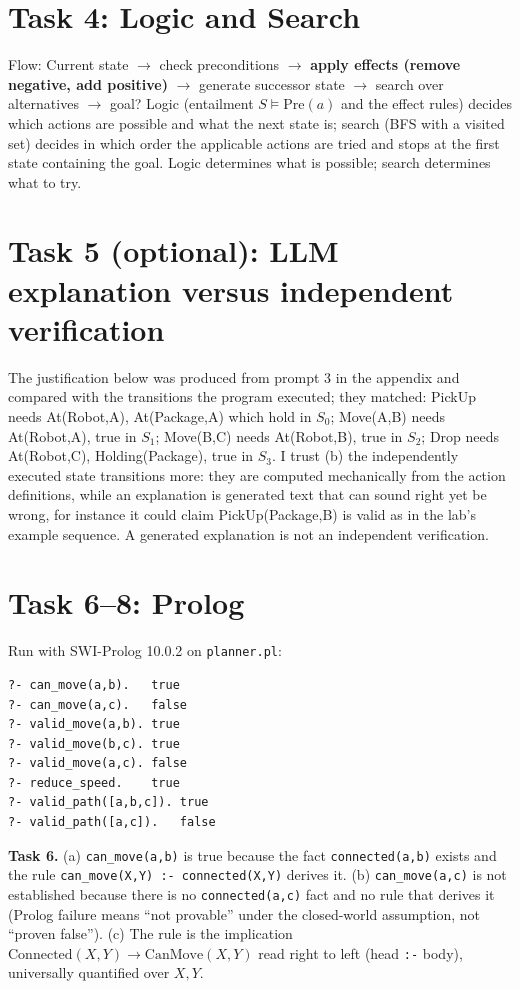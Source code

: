 \documentclass[10pt,a4paper]{article}
\begin{document}
\section*{Task 4: Logic and Search}
Flow: Current state $\to$ check preconditions $\to$ \textbf{apply effects (remove negative, add positive)} $\to$ generate successor state $\to$ search over alternatives $\to$ goal? Logic (entailment $S\models \mathrm{Pre}(a)$ and the effect rules) decides which actions are possible and what the next state is; search (BFS with a visited set) decides in which order the applicable actions are tried and stops at the first state containing the goal. Logic determines what is possible; search determines what to try.

\section*{Task 5 (optional): LLM explanation versus independent verification}
The justification below was produced from prompt 3 in the appendix and compared with the transitions the program executed; they matched: PickUp needs At(Robot,A), At(Package,A) which hold in $S_0$; Move(A,B) needs At(Robot,A), true in $S_1$; Move(B,C) needs At(Robot,B), true in $S_2$; Drop needs At(Robot,C), Holding(Package), true in $S_3$. I trust (b) the independently executed state transitions more: they are computed mechanically from the action definitions, while an explanation is generated text that can sound right yet be wrong, for instance it could claim PickUp(Package,B) is valid as in the lab's example sequence. A generated explanation is not an independent verification.

\section*{Task 6--8: Prolog}
Run with SWI-Prolog 10.0.2 on \texttt{planner.pl}:
\begin{Verbatim}
?- can_move(a,b).   true
?- can_move(a,c).   false
?- valid_move(a,b). true
?- valid_move(b,c). true
?- valid_move(a,c). false
?- reduce_speed.    true
?- valid_path([a,b,c]). true
?- valid_path([a,c]).   false
\end{Verbatim}
\textbf{Task 6.} (a) \texttt{can\_move(a,b)} is true because the fact \texttt{connected(a,b)} exists and the rule \texttt{can\_move(X,Y) :- connected(X,Y)} derives it. (b) \texttt{can\_move(a,c)} is not established because there is no \texttt{connected(a,c)} fact and no rule that derives it (Prolog failure means ``not provable'' under the closed-world assumption, not ``proven false''). (c) The rule is the implication $\mathrm{Connected}(X,Y)\rightarrow\mathrm{CanMove}(X,Y)$ read right to left (head \texttt{:-} body), universally quantified over $X,Y$.
\end{document}
